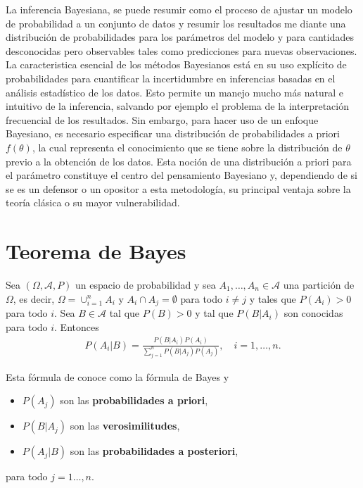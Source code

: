 La inferencia Bayesiana, se puede resumir como el proceso de ajustar un modelo de probabilidad a un conjunto de datos y resumir los resultados me diante una distribución de probabilidades para los parámetros del modelo y para cantidades desconocidas pero observables tales como predicciones para nuevas observaciones. La caracteristica esencial de los métodos Bayesianos está en su uso explícito de probabilidades para cuantificar la incertidumbre en inferencias basadas en el análisis estadístico de los datos. Esto permite un manejo mucho más natural e intuitivo de la inferencia, salvando por ejemplo el problema de la interpretación frecuencial de los resultados. Sin embargo, para hacer uso de un enfoque Bayesiano, es necesario especificar una distribución de probabilidades a priori $f(\theta)$, la cual representa el conocimiento que se tiene sobre la distribución de $\theta$ previo a la obtención de los datos. Esta noción de una distribución a priori para el parámetro constituye el centro del pensamiento Bayesiano y, dependiendo de si se es un defensor o un opositor a esta metodología, su principal ventaja sobre la teoría clásica o su mayor vulnerabilidad.

\section{Teorema de Bayes}

\begin{teo}[de Bayes]
    Sea $(\Omega, \mathcal{A}, P)$ un espacio de probabilidad y sea $A_1, \ldots, A_n \in \mathcal{A}$ una partición de $\Omega$, es decir, $\Omega = \cup_{i=1}^{n} A_i$ y $A_i \cap A_j = \emptyset$ para todo $i \not = j$ y tales que $P(A_i) > 0$ para todo $i$. Sea $B \in \mathcal{A}$ tal que $P(B) > 0$ y tal que  $P(B | A_i)$ son conocidas para todo $i$. Entonces
    \begin{align*}
        P(A_i | B) = \frac{P(B|A_i)P(A_i)}{\sum_{j=1}^{n} P(B|A_j)P(A_j)}, \quad i=1, \ldots,n.
    \end{align*}
\end{teo}
Esta fórmula de conoce como la fórmula de Bayes y
\begin{itemize}
    \item $P(A_j)$ son las \textbf{probabilidades a priori},
    \item $P(B|A_j)$ son las \textbf{verosimilitudes},
    \item $P(A_j|B)$ son las \textbf{probabilidades a posteriori},
\end{itemize}
para todo $j=1 \ldots, n$.

